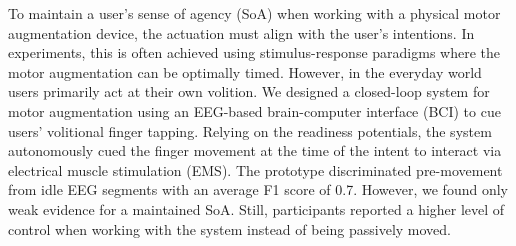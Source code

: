 
To maintain a user's sense of agency (SoA) when working with a physical motor augmentation device, the actuation must align with the user's intentions. In experiments, this is often achieved using stimulus-response paradigms where the motor augmentation can be optimally timed. However, in the everyday world users primarily act at their own volition. We designed a closed-loop system for motor augmentation using an EEG-based brain-computer interface (BCI) to cue users' volitional finger tapping. Relying on the readiness potentials, the system autonomously cued the finger movement at the time of the intent to interact via electrical muscle stimulation (EMS). The prototype discriminated pre-movement from idle EEG segments with an average F1 score of 0.7. However, we found only weak evidence for a maintained SoA. Still, participants reported a higher level of control when working with the system instead of being passively moved.


